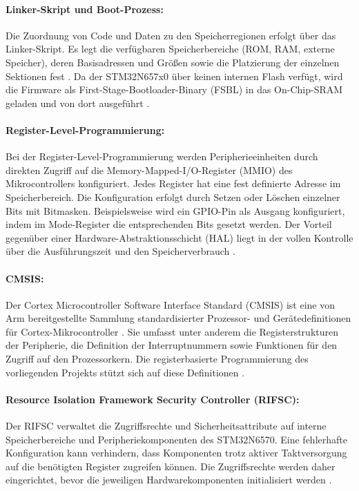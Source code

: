 \paragraph{Linker-Skript und Boot-Prozess:}
Die Zuordnung von Code und Daten zu den Speicherregionen erfolgt über das Linker-Skript. Es legt die verfügbaren Speicherbereiche (ROM, RAM, externe Speicher), deren Basisadressen und Größen sowie die Platzierung der einzelnen Sektionen fest \cite[Kap. ~2.4]{yiuDefinitiveGuideARM2013}. Da der STM32N657x0 über keinen internen Flash verfügt, wird die Firmware als First-Stage-Bootloader-Binary (FSBL) in das On-Chip-SRAM geladen und von dort ausgeführt \cite[S. ~286 ff., S. ~183 ff.]{rm0486}.

\paragraph{Register-Level-Programmierung:}
Bei der Register-Level-Programmierung werden Peripherieeinheiten durch direkten Zugriff auf die Memory-Mapped-I/O-Register (MMIO) des Mikrocontrollers konfiguriert. Jedes Register hat eine fest definierte Adresse im Speicherbereich. Die Konfiguration erfolgt durch Setzen oder Löschen einzelner Bits mit Bitmasken. Beispielsweise wird ein GPIO-Pin als Ausgang konfiguriert, indem im Mode-Register die entsprechenden Bits gesetzt werden. Der Vorteil gegenüber einer Hardware-Abstraktionsschicht (HAL) liegt in der vollen Kontrolle über die Ausführungszeit und den Speicherverbrauch \cite[Kap. ~2]{GbatiIsrael2024BECP}.

\paragraph{CMSIS:}
Der Cortex Microcontroller Software Interface Standard (CMSIS) ist eine von Arm bereitgestellte Sammlung standardisierter Prozessor- und Gerätedefinitionen für Cortex-Mikro\-controller \cite{CMSISIntroduction}. Sie umfasst unter anderem die Registerstrukturen der Peripherie, die Definition der Interruptnummern sowie Funktionen für den Zugriff auf den Prozessorkern. Die registerbasierte Programmierung des vorliegenden Projekts stützt sich auf diese Definitionen \cite[Kap. ~2.9]{yiuDefinitiveGuideARM2013}.

\paragraph{Resource Isolation Framework Security Controller (RIFSC):}
Der RIFSC verwaltet die Zugriffsrechte und Sicherheitsattribute auf interne Speicherbereiche und Peripheriekomponenten des STM32N6570. Eine fehlerhafte Konfiguration kann verhindern, dass Komponenten trotz aktiver Taktversorgung auf die benötigten Register zugreifen können. Die Zugriffsrechte werden daher eingerichtet, bevor die jeweiligen Hardwarekomponenten initialisiert werden \cite{ResourceIsolationFramework}.

